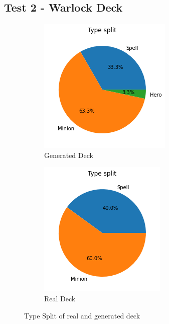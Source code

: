 \documentclass{report} %
\begin{document}
\subsection{Test 2 - Warlock Deck}
\begin{figure}[H]
\centering
\begin{subfigure}{.5\textwidth}
 \centering
 \includegraphics[width=.75\linewidth]{TestImages/WarlockDeckSplitFake}
 \caption{Generated Deck}
\end{subfigure}%
\begin{subfigure}{.5\textwidth}
 \centering
 \includegraphics[width=.75\linewidth]{TestImages/WarlockDeckSplitReal}
 \caption{Real Deck}
\end{subfigure}
\caption{Type Split of real and generated deck}
\end{figure}
\end{document}
